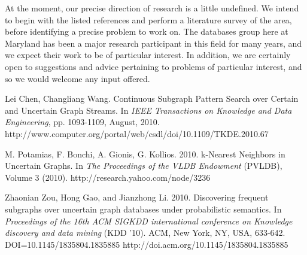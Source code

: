 \documentclass{article}
\begin{document}
At the moment, our precise direction of research is a little undefined.  We
intend to begin with the listed references and perform a literature survey
of the area, before identifying a precise problem to work on.  The databases
group here at Maryland has been a major research participant in this field
for many years, and we expect their work to be of particular interest.
In addition, we are certainly open to suggestions and advice pertaining
to problems of particular interest, and so we would welcome any input
offered.

\begin{thebibliography}{10}

 Lei Chen, Changliang Wang.  Continuous
Subgraph Pattern Search over Certain and Uncertain Graph Streams.  In
\emph{IEEE Transactions on Knowledge and Data Engineering}, pp. 1093-1109,
August, 2010.  http://www.computer.org/portal/web/csdl/doi/10.1109/TKDE.2010.67

 M. Potamias, F. Bonchi, A. Gionis, G. Kollios.
2010.  k-Nearest Neighbors in Uncertain Graphs.  In \emph{The Proceedings
of the VLDB Endowment} (PVLDB), Volume 3 (2010).  
http://research.yahoo.com/node/3236

 Zhaonian Zou, Hong Gao, and Jianzhong Li.
2010. Discovering frequent subgraphs over uncertain graph databases
under probabilistic semantics. In \emph{Proceedings of the 16th ACM SIGKDD
international conference on Knowledge discovery and data mining}
(KDD '10). ACM, New York, NY, USA, 633-642. DOI=10.1145/1835804.1835885
http://doi.acm.org/10.1145/1835804.1835885 



\end{thebibliography}
\end{document}
